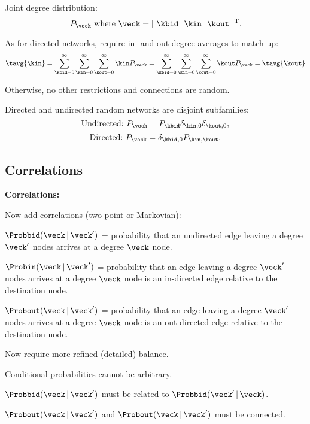   
  
    Joint degree distribution:
    $$
    P_{\veck}
    \ \mbox{where} \
    \veck = [\ \kbid \ \  \kin \ \ \kout\ ]^{\textnormal{T}}.
    $$
  
    As for directed networks, require in- and out-degree
    averages to match up:
        $$
    \tavg{\kin}
    =
    \sum_{\kbid=0}^\infty
    \sum_{\kin=0}^\infty
    \sum_{\kout=0}^\infty
    \kin
    P_{\veck}
    = 
    \sum_{\kbid=0}^\infty
    \sum_{\kin=0}^\infty
    \sum_{\kout=0}^\infty
    \kout
    P_{\veck}
    =
    \tavg{\kout}
    $$
  
    Otherwise, no other restrictions and connections are random.
  
    Directed and undirected random networks are disjoint subfamilies:
    $$
    \mbox{Undirected:} \
    P_{\veck}
    =
    P_{\kbid} \delta_{\kin,0} \delta_{\kout,0},
    $$
    $$
    \mbox{Directed:} \
    P_{\veck}
    =
    \delta_{\kbid,0} P_{\kin,\kout}.
    $$
  
  

\subsection{Correlations}

  \textbf{Correlations:}
  
  
  
    Now add correlations (two point or Markovian):
    
    
    $
    \Probbid(\veck\,|\, \veck')
    $
    = 
    probability that an undirected edge leaving 
    a degree $\veck'$ nodes arrives at a degree $\veck$ node.
     
    $
    \Probin(\veck\,|\, \veck')
    $
    = probability that an edge leaving 
    a degree $\veck'$ nodes arrives at a degree $\veck$ node
    is an in-directed edge
    relative to the destination node.
     
    $
    \Probout(\veck\,|\, \veck')
    $
    = probability that an edge leaving 
    a degree $\veck'$ nodes arrives at a degree $\veck$ node
    is an out-directed edge
    relative to the destination node.
    
  
    Now require more refined (detailed) balance.
  
    Conditional probabilities cannot be arbitrary.
    
     
      $\Probbid(\veck\,|\, \veck')$ must be related
      to $\Probbid(\veck'\,|\, \veck)$.
    
      $\Probout(\veck\,|\, \veck')$ 
      and $\Probout(\veck\,|\, \veck')$ 
      must be connected.
    
